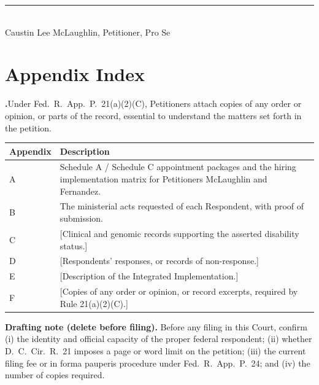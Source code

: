 \documentclass[14pt,letterpaper]{extarticle}
\newcounter{para}
\newcommand{\np}{%
  \par\medskip
  \refstepcounter{para}%
  \noindent\hangindent=0.45in\hangafter=1
  \textbf{\arabic{para}.}\hspace{0.15in}\ignorespaces}
\begin{document}
\vspace{0.35in}
\noindent\rule{3.0in}{0.4pt}\\
Caustin Lee McLaughlin, Petitioner, Pro Se

\vspace{0.3in}
\section{Appendix Index}

\np Under Fed.\ R.\ App.\ P.\ 21(a)(2)(C), Petitioners attach copies of any order
or opinion, or parts of the record, essential to understand the matters set
forth in the petition.

\begin{longtable}{@{}p{1.0in}p{5.0in}@{}}
\toprule
Appendix & Description\\
\midrule
\endhead
A & Schedule A / Schedule C appointment packages and the hiring implementation
matrix for Petitioners McLaughlin and Fernandez.\\
B & The ministerial acts requested of each Respondent, with proof of submission.\\
C & [Clinical and genomic records supporting the asserted disability status.]\\
D & [Respondents' responses, or records of non-response.]\\
E & [Description of the Integrated Implementation.]\\
F & [Copies of any order or opinion, or record excerpts, required by Rule
21(a)(2)(C).]\\
\bottomrule
\end{longtable}

\vspace{0.2in}
\noindent\footnotesize\textbf{Drafting note (delete before filing).} Before any
filing in this Court, confirm (i) the identity and official capacity of the
proper federal respondent; (ii) whether D.\ C.\ Cir.\ R.\ 21 imposes a page or
word limit on the petition; (iii) the current filing fee or in forma pauperis
procedure under Fed.\ R.\ App.\ P.\ 24; and (iv) the number of copies required.
\end{document}
